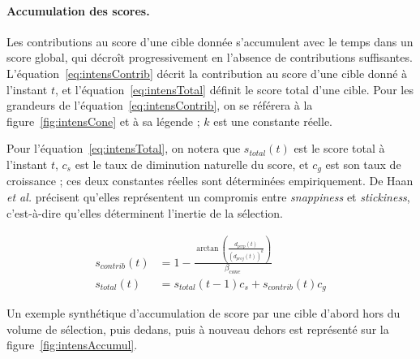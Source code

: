 	\paragraph{Accumulation des scores.}
	Les contributions au score d'une cible donnée s'accumulent avec le temps dans un score global, qui décroît progressivement en l'absence de contributions suffisantes. L'équation~\ref{eq:intensContrib} décrit la contribution au score d'une cible donné à l'instant $t$, et l'équation~\ref{eq:intensTotal} définit le score total d'une cible. Pour les grandeurs de l'équation~\ref{eq:intensContrib}, on se référera à la figure~\ref{fig:intensCone} et à sa légende ; $k$ est une constante réelle.
	
	Pour l'équation~\ref{eq:intensTotal}, on notera que $s_{total}(t)$ est le score total à l'instant $t$, $c_{s}$ est le taux de diminution naturelle du score, et $c_{g}$ est son taux de croissance ; ces deux constantes réelles sont déterminées empiriquement. De Haan \emph{et al.} précisent qu'elles représentent un compromis entre \emph{snappiness} et \emph{stickiness}, c'est-à-dire qu'elles déterminent l'inertie de la sélection.
	
	\begin{align}
		\label{eq:intensContrib}
		s_{contrib}(t) &= 1 - \frac{\arctan \left(\frac{d_{perp}(t)}{\left(d_{proj}(t)\right)^{k}}\right)}{\beta_{cone}} \\
		\label{eq:intensTotal}
		s_{total}(t) &= s_{total}(t-1)c_{s} + s_{contrib}(t)c_{g}
	\end{align}
	
	Un exemple synthétique d'accumulation de score par une cible d'abord hors du volume de sélection, puis dedans, puis à nouveau dehors est représenté sur la figure~\ref{fig:intensAccumul}.

